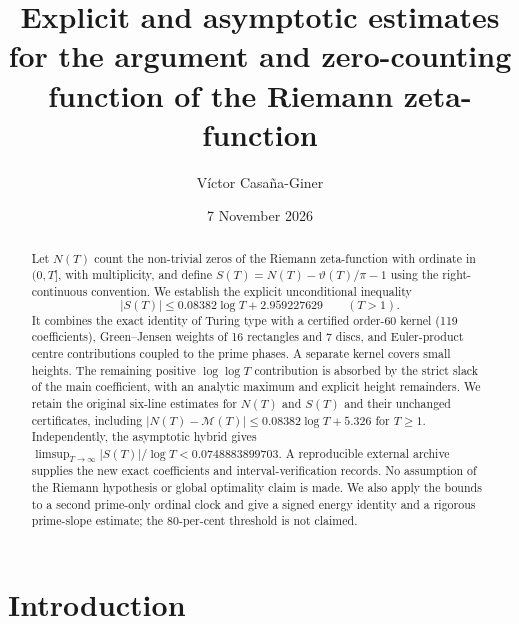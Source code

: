 \documentclass[11pt,reqno]{amsart}
\title[Explicit bounds for $S(T)$ and $N(T)$]{Explicit and asymptotic estimates for the argument and zero-counting function of the Riemann zeta-function}
\author{V\'ictor Casa\~na-Giner}
\date{7 November 2026}
\numberwithin{equation}{section}
\theoremstyle{definition}
\theoremstyle{remark}
\newcommand{\GreenC}{2.959227629}
\newcommand{\GreenA}{0.08382}
\begin{document}
\begin{abstract}
Let $N(T)$ count the non-trivial zeros of the Riemann zeta-function
with ordinate in $(0,T]$, with multiplicity, and define
$S(T)=N(T)-\vartheta(T)/\pi-1$ using the right-continuous convention.
We establish the explicit unconditional inequality
\[
|S(T)|\le\GreenA\log T+\GreenC\qquad(T>1).
\]
It combines the exact identity of Turing type with a certified order-$60$
kernel (119 coefficients), Green--Jensen weights of 16 rectangles and
7 discs, and Euler-product centre contributions coupled to the prime
phases. A separate kernel covers small heights. The remaining positive
$\log\log T$ contribution is absorbed by the strict slack of the main
coefficient, with an analytic maximum and explicit height remainders.
We retain the original six-line estimates for $N(T)$ and $S(T)$ and
their unchanged certificates, including
$|N(T)-\mathcal M(T)|\le0.08382\log T+5.326$ for $T\ge1$.
Independently, the asymptotic hybrid gives
$\limsup_{T\to\infty}|S(T)|/\log T<0.0748883899703$.
A reproducible external archive supplies the new exact coefficients
and interval-verification records. No assumption of the Riemann
hypothesis or global optimality claim is made. We also apply the
bounds to a second prime-only ordinal clock and give a signed
energy identity and a rigorous prime-slope estimate; the
80-per-cent threshold is not claimed.
\end{abstract}

\maketitle
\tableofcontents

\section{Introduction}\label{sec:intro}
\end{document}
